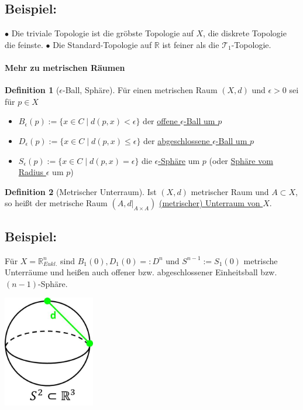 \documentclass[a4paper,11pt,notitlepage]{report}
\theoremstyle{remark}
\theoremstyle{definition}
\newtheorem{definition}{Definition}[chapter]
\newcommand{\R}{{\ensuremath{\mathbb{R}}}}
\newenvironment{bsp}[1]
{
\setlength{\fboxsep}{10pt}
\subsection*{Beispiel: #1}
\begin{upshape}
}
{
\end{upshape}
}
\begin{document}
\begin{bsp}{}
	$\bullet$ Die triviale Topologie ist die gröbste Topologie auf $X$, die diskrete Topologie die feinste.
	\newline
	$\bullet$ Die Standard-Topologie auf $\R$ ist feiner als die $\mathcal{T}_1$-Topologie.
\end{bsp}

\newpage
\paragraph{Mehr zu metrischen Räumen}

\begin{definition}[$\epsilon$-Ball, Sphäre]
	Für einen metrischen Raum $(X,d)$ und $\epsilon > 0$ sei für $p \in X$
	\begin{itemize}
		\item $B_\epsilon(p):=\{x \in C \mid d(p,x) < \epsilon \}$ der \underline{offene $\epsilon$-Ball um $p$}
		\item $D_\epsilon(p):=\{x \in C \mid d(p,x) \leq \epsilon \}$ der \underline{abgeschlossene $\epsilon$-Ball um $p$}
		\item $S_\epsilon(p):=\{x \in C \mid d(p,x) = \epsilon \}$ die \underline{ $\epsilon$-Sphäre} um $p$ (oder \underline{Sphäre vom Radius $\epsilon$} um $p$)
	\end{itemize}
\end{definition}

\begin{definition}[Metrischer Unterraum]
	Ist $(X,d)$ metrischer Raum und $A \subset X$, so heißt der metrische Raum $(A, d \big |_{A \times A})$ \underline{(metrischer) Unterraum von $X$}.
\end{definition}

\begin{bsp}{}
	Für $X=\R_{Eukl.}^{n}$ sind $B_1(0), D_1(0) =: D^n$ und $S^{n-1}:=S_1(0)$ metrische Unterräume und heißen auch offener bzw. abgeschlossener Einheitsball bzw. $(n-1)$-Sphäre.
	\newline
	\begin{center}
	\includegraphics[width=0.3\textwidth]{images/metrischer_unterraum.jpg}
	\end{center}
\end{bsp}
\end{document}

